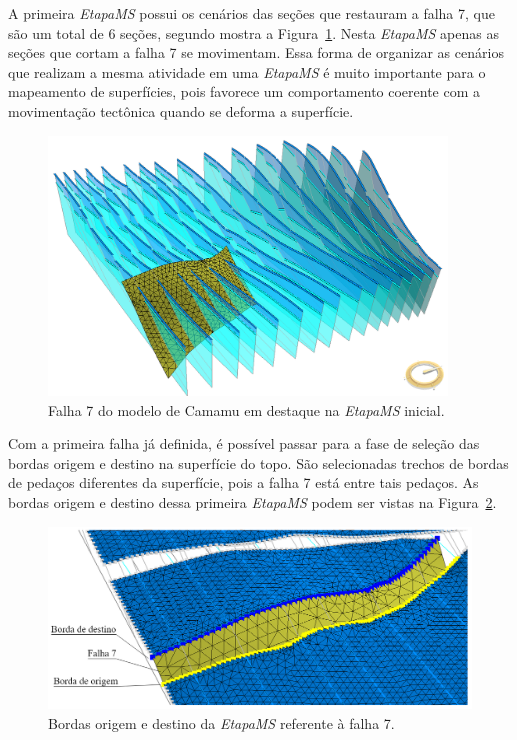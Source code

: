 A primeira \textit{EtapaMS} possui os cenários das seções que restauram a falha 7, que são um total de 6 seções, segundo mostra a Figura~\ref{fig-example-2-5}. Nesta \textit{EtapaMS} apenas as seções que cortam a falha 7 se movimentam. Essa forma de organizar as cenários que realizam a mesma atividade em uma \textit{EtapaMS} é muito importante para o mapeamento de superfícies, pois favorece um comportamento coerente com a movimentação tectônica quando se deforma a superfície.

\begin{figure} [H]
  \begin{center}
    \includegraphics[width=300pt]{images/fig-example-2-5}
    \caption{Falha 7 do modelo de Camamu em destaque na \textit{EtapaMS} inicial.}\label{fig-example-2-5}
  \end{center}
\end{figure}

Com a primeira falha já definida, é possível passar para a fase de seleção das bordas origem e destino na superfície do topo. São selecionadas trechos de bordas de pedaços diferentes da superfície, pois a falha 7 está entre tais pedaços. As bordas origem e destino dessa primeira \textit{EtapaMS} podem ser vistas na Figura~\ref{fig-example-2-6}.

\begin{figure} [H]
  \begin{center}
    \includegraphics[width=350pt]{images/fig-example-2-6}
    \caption{Bordas origem e destino da \textit{EtapaMS} referente à falha 7.}\label{fig-example-2-6}
  \end{center}
\end{figure}

